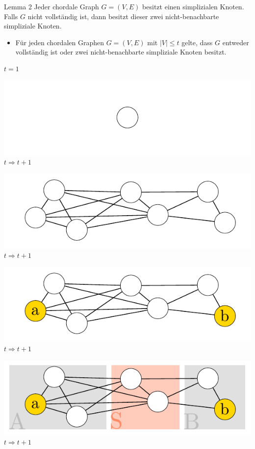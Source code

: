 \documentclass[xcolor=x11names,compress]{beamer}
\begin{document}
\begin{frame}
	\begin{block}{Lemma 2}
		Jeder chordale Graph \( G = \left( V, E \right) \) besitzt einen simplizialen Knoten. Falls \( G \) nicht vollständig ist, dann besitzt dieser zwei nicht-benachbarte simpliziale Knoten.
	\end{block}
	\begin{itemize}
		\item<2->[IV] Für jeden chordalen Graphen \( G = \left( V, E \right) \) mit \( \left| V \right| \leq t \) gelte, dass \( G \) entweder vollständig ist oder zwei nicht-benachbarte simpliziale Knoten besitzt.
	\end{itemize}
	\begin{overprint}
		\( t = 1 \)

		\includegraphics[scale=1.0]{img/graph/simplicialproof/ia.pdf}
		\onslide<4>
		\( t \Rightarrow t + 1 \)

		\includegraphics[scale=1.0]{img/graph/simplicialproof/iv-01.pdf}
		\onslide<5>
		\( t \Rightarrow t + 1 \)

		\includegraphics[scale=1.0]{img/graph/simplicialproof/iv-02.pdf}
		\onslide<6>
		\( t \Rightarrow t + 1 \)

		\includegraphics[scale=1.0]{img/graph/simplicialproof/iv-03.pdf}
		\onslide<7>
		\( t \Rightarrow t + 1 \)


\end{overprint}
\end{frame}
\end{document}
